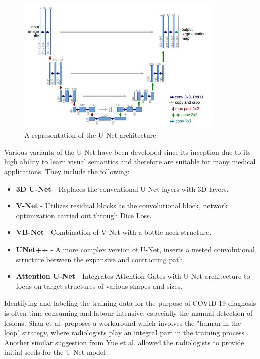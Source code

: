\begin{figure}[H]
    \centering
    \includegraphics[height=6.5cm]{Images/UNet.JPG}
    \caption[U-Net Architecture]{A representation of the U-Net architecture \cite{RFT2015}}
    \label{fig:U-Net Architecture}
    \end{figure}
\vspace{-2em}
Various variants of the U-Net have been developed since its inception due to its high ability to learn visual semantics and therefore are suitable 
for many medical applications. They include the following:
\begin{itemize}
    \item \textbf{3D U-Net} - Replaces the conventional U-Net layers with 3D layers. \cite{SCS+2020}
    \item \textbf{V-Net} - Utilizes residual blocks as the convolutional block, network optimization carried out through Dice Loss. \cite{MNA+2020}
    \item \textbf{VB-Net} - Combination of V-Net with a bottle-neck structure. \cite{SFY+2020}
    \item \textbf{UNet++} - A more complex version of U-Net, inserts a nested convolutional structure between the expansive and contracting path. \cite{ZSM+2020}
    \item \textbf{Attention U-Net} - Integrates Attention Gates with U-Net architecture to focus on target structures of various shapes and sizes. \cite{OSF+2020}
\end{itemize}

Identifying and labeling the training data for the purpose of COVID-19 diagnosis is often 
time consuming and labour intensive, especially the manual detection of lesions. Shan et al. proposes a workaround which involves the "human-in-the-loop" strategy, 
where radiologists play an integral part in the training process \cite{SFY+2020}. Another similar suggestion from Yue et al. allowed the radiologists to provide initial seeds for the U-Net  model \cite{YHQ+2020}.


